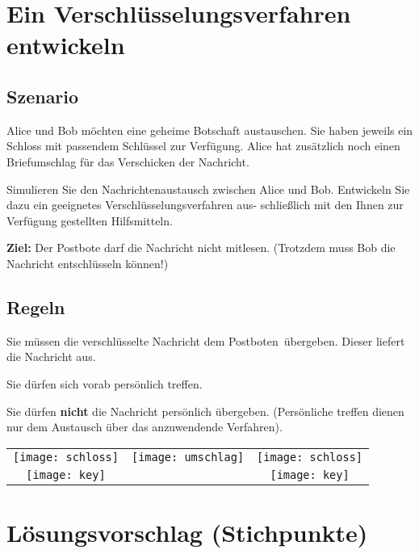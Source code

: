\documentclass[]{schulein}
\begin{document}
 
\section*{Ein Verschlüsselungsverfahren entwickeln}
\subsection*{Szenario}
Alice und Bob möchten eine geheime Botschaft austauschen. Sie haben jeweils ein Schloss mit passendem Schlüssel zur Verfügung. Alice hat zusätzlich noch einen Briefumschlag für das Verschicken der Nachricht.

\par
Simulieren Sie den Nachrichtenaustausch zwischen Alice und Bob. Entwickeln Sie dazu ein geeignetes Verschlüsselungsverfahren aus- schließlich mit den Ihnen zur Verfügung gestellten Hilfsmitteln.

\textbf{Ziel:} Der Postbote darf die Nachricht nicht mitlesen. (Trotzdem muss Bob die Nachricht entschlüsseln können!)

\begin{minipage}{.5\textwidth}
\subsection*{Regeln}
\begin{smallitemize}
\item Sie müssen die verschlüsselte Nachricht dem \glqq Postboten\grqq\ übergeben. Dieser liefert die Nachricht aus.
\item Sie dürfen sich vorab persönlich treffen.
\item Sie dürfen \textbf{nicht} die Nachricht persönlich übergeben. (Persönliche treffen dienen nur dem Austausch über das anzuwendende Verfahren).
\end{smallitemize}
\end{minipage}
\begin{minipage}{.5\textwidth}
\begin{tabular}{ccc}
\texttt{[image: schloss]} & 
\texttt{[image: umschlag]}&
\texttt{[image: schloss]} \\
\hspace*{-.7cm}\texttt{[image: key]}& &
\hspace*{-.7cm}\texttt{[image: key]}
\end{tabular}
\end{minipage}

\section*{Lösungsvorschlag (Stichpunkte)}
\end{document}

